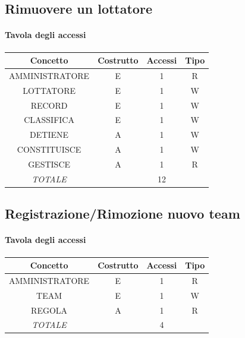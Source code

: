 \documentclass[a4paper,12pt]{report}
\begin{document}
\subsection{Rimuovere un lottatore}
\begin{table}[H]
    \paragraph{Tavola degli accessi\newline}
    \begin{tabular}{|c|c|c|c|}
    \hline
    Concetto          & Costrutto & Accessi & Tipo \\ \hline
    AMMINISTRATORE    & E         & 1       & R    \\ \hline
    LOTTATORE         & E         & 1       & W    \\ \hline
    RECORD            & E         & 1       & W    \\ \hline
    CLASSIFICA        & E         & 1       & W    \\ \hline
    DETIENE           & A         & 1       & W    \\ \hline
    CONSTITUISCE      & A         & 1       & W    \\ \hline
    GESTISCE          & A         & 1       & R    \\ \hline
    \textit{TOTALE}   &           & 12      &      \\ \hline
    \end{tabular}
\end{table}

\subsection{Registrazione/Rimozione nuovo team}
\begin{table}[H]
    \paragraph{Tavola degli accessi\newline}
    \begin{tabular}{|c|c|c|c|}
    \hline
    Concetto          & Costrutto & Accessi & Tipo \\ \hline
    AMMINISTRATORE    & E         & 1       & R    \\ \hline
    TEAM              & E         & 1       & W    \\ \hline
    REGOLA            & A         & 1       & R    \\ \hline
    \textit{TOTALE}   &           & 4       &      \\ \hline
    \end{tabular}
\end{table}
\end{document}
